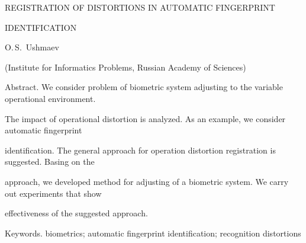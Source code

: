 REGISTRATION OF DISTORTIONS IN AUTOMATIC FINGERPRINT 


IDENTIFICATION





O.\,S.~Ushmaev


(Institute for Informatics Problems, Russian Academy of Sciences)





Abstract. We consider problem of biometric system adjusting to the variable operational environment. 


The impact of operational distortion is analyzed. As an example, we consider automatic fingerprint 


identification. The general approach for operation distortion registration is suggested. Basing on the 


approach, we developed method for adjusting of a biometric system. We carry out experiments that show 


effectiveness of the suggested approach. 





Keywords. biometrics; automatic fingerprint identification; recognition distortions





